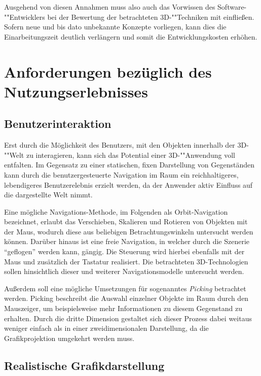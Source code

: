 Ausgehend von diesen Annahmen muss also auch das Vorwissen des Software-""Entwicklers bei der Bewertung der betrachteten 3D-""Techniken mit einfließen. Sofern neue und bis dato unbekannte Konzepte vorliegen, kann dies die Einarbeitungszeit deutlich verlängern und somit die Entwicklungskosten erhöhen.

\section{Anforderungen bezüglich des Nutzungserlebnisses}

\subsection{Benutzerinteraktion}

Erst durch die Möglichkeit des Benutzers, mit den Objekten innerhalb der 3D-""Welt zu interagieren, kann sich das Potential einer 3D-""Anwendung voll entfalten. Im Gegensatz zu einer statischen, fixen Darstellung von Gegenständen kann durch die benutzergesteuerte Navigation im Raum ein reichhaltigeres, lebendigeres Benutzerelebnis erzielt werden, da der Anwender aktiv Einfluss auf die dargestellte Welt nimmt.

Eine mögliche Navigations-Methode, im Folgenden als Orbit-Navigation bezeichnet, erlaubt das Verschieben, Skalieren und Rotieren von Objekten mit der Maus, wodurch diese aus beliebigen Betrachtungswinkeln untersucht werden können. Darüber hinaus ist eine freie Navigation, in welcher durch die Szenerie \enquote{geflogen} werden kann, gängig. Die Steuerung wird hierbei ebenfalls mit der Maus und zusätzlich der Tastatur realisiert. Die betrachteten 3D-Technologien sollen hinsichtlich dieser und weiterer Navigationsmodelle untersucht werden.

Außerdem soll eine mögliche Umsetzungen für sogenanntes \emph{Picking} betrachtet werden. Picking beschreibt die Auswahl einzelner Objekte im Raum durch den Mauszeiger, um beispielsweise mehr Informationen zu diesem Gegenstand zu erhalten. Durch die dritte Dimension gestaltet sich dieser Prozess dabei weitaus weniger einfach als in einer zweidimensionalen Darstellung, da die Grafikprojektion umgekehrt werden muss.

\subsection{Realistische Grafikdarstellung}

